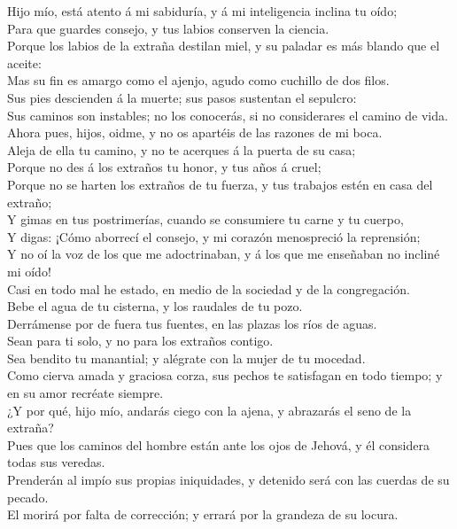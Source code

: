  Hijo mío, está atento á mi sabiduría, y á mi inteligencia
inclina tu oído;\\
 Para que guardes consejo, y tus labios conserven la
ciencia.\\
 Porque los labios de la extraña destilan miel, y su paladar
es más blando que el aceite:\\
 Mas su fin es amargo como el ajenjo, agudo como cuchillo de
dos filos.\\
 Sus pies descienden á la muerte; sus pasos sustentan el
sepulcro:\\
 Sus caminos son instables; no los conocerás, si no
considerares el camino de vida.\\
 Ahora pues, hijos, oidme, y no os apartéis de las razones
de mi boca.\\
 Aleja de ella tu camino, y no te acerques á la puerta de su
casa;\\
 Porque no des á los extraños tu honor, y tus años á
cruel;\\
 Porque no se harten los extraños de tu fuerza, y tus
trabajos estén en casa del extraño;\\
 Y gimas en tus postrimerías, cuando se consumiere tu carne
y tu cuerpo,\\
 Y digas: ¡Cómo aborrecí el consejo, y mi corazón
menospreció la reprensión;\\
 Y no oí la voz de los que me adoctrinaban, y á los que me
enseñaban no incliné mi oído!\\
 Casi en todo mal he estado, en medio de la sociedad y de
la congregación.\\
 Bebe el agua de tu cisterna, y los raudales de tu pozo.\\
 Derrámense por de fuera tus fuentes, en las plazas los
ríos de aguas.\\
 Sean para ti solo, y no para los extraños contigo.\\
 Sea bendito tu manantial; y alégrate con la mujer de tu
mocedad.\\
 Como cierva amada y graciosa corza, sus pechos te
satisfagan en todo tiempo; y en su amor recréate siempre.\\
 ¿Y por qué, hijo mío, andarás ciego con la ajena, y
abrazarás el seno de la extraña?\\
 Pues que los caminos del hombre están ante los ojos de
Jehová, y él considera todas sus veredas.\\
 Prenderán al impío sus propias iniquidades, y detenido
será con las cuerdas de su pecado.\\
 El morirá por falta de corrección; y errará por la
grandeza de su locura.

